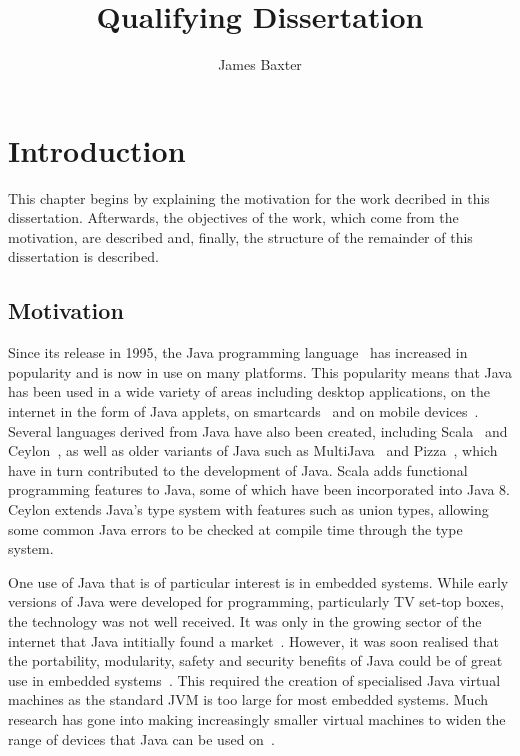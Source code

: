 \documentclass[a4paper,10pt]{report}
\title{Qualifying Dissertation}
\author{James Baxter}
\date{}
\begin{document}
\maketitle


\tableofcontents

\chapter{Introduction}

This chapter begins by explaining the motivation for the work decribed in this
dissertation. Afterwards, the objectives of the work, which come from the
motivation, are described and, finally, the structure of the remainder of this
dissertation is described.

\section{Motivation}

Since its release in 1995, the Java programming language~\cite{gosling2013} has
increased in popularity and is now in use on many platforms.  This popularity
means that Java has been used in a wide variety of areas including desktop
applications, on the internet in the form of Java applets, on
smartcards~\cite{chen2000} and on mobile devices~\cite{oracle2014}.  Several
languages derived from Java have also been created, including
Scala~\cite{lausanne2015} and Ceylon~\cite{redhat2015}, as well as older
variants of Java such as MultiJava~\cite{clifton2006} and
Pizza~\cite{odersky1997}, which have in turn contributed to the development of
Java. Scala adds functional programming features to Java, some of which have
been incorporated into Java 8. Ceylon extends Java's type system with features
such as union types, allowing some common Java errors to be checked at compile
time through the type system.

One use of Java that is of particular interest is in embedded systems.  While
early versions of Java were developed for programming, particularly TV set-top
boxes, the technology was not well received. It was only in the growing sector
of the internet that Java intitially found a market~\cite{horstmann2002}.
However, it was soon realised that the portability, modularity, safety and
security benefits of Java could be of great use in embedded
systems~\cite{mulchandani1998}.  This required the creation of specialised Java
virtual machines as the standard JVM is too large for most embedded systems.
Much research has gone into making increasingly smaller virtual machines to
widen the range of devices that Java can be used on~\cite{caska2011,thomm2010}.
\end{document}
